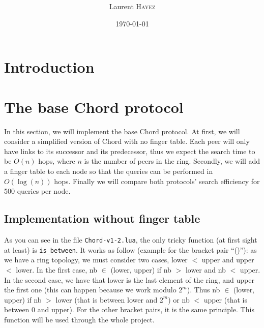 \documentclass[a4paper, 11pt]{article}
\title{%
  \normalfont{\bfseries{\rule{\linewidth}{2pt} Large-Scale Distributed Systems\\Project 2: Distributed Hash Tables\\ %
    \vspace{-0.4cm}  \rule{\linewidth}{2pt}}}
  }
\author{Laurent \textsc{Hayez}}
\date{\today}
\theoremstyle{plain}
\theoremstyle{definition}
\begin{document}
\renewcommand{\proofname}{{\scshape Proof}}
\renewcommand{\labelitemi}{\textbullet}


\maketitle

\renewcommand{\contentsname}{Table of contents}
\tableofcontents



\section{Introduction}
\label{sec:introduction}

  


\section{The base Chord protocol}
\label{sec:base-chord-protocol}

  In this section, we will implement the base Chord protocol. At first, we will consider a simplified version
  of Chord with no finger table. Each peer will only have links to its successor and its predecessor, thus we
  expect the search time to be $O(n)$ hops, where $n$ is the number of peers in the ring. Secondly, we will add a
  finger table to each node so that the queries can be performed in $O(\log(n))$ hops. Finally we will compare
  both protocols' search efficiency for 500 queries per node.

  \subsection{Implementation without finger table}
  \label{sec:implementation-without-ft}
  
    As you can see in the file \texttt{Chord-v1-2.lua}, the only tricky function (at first sight at least) is
    \texttt{is\_between}. It works as follow (example for the bracket pair ``()''): as we have a ring topology, we
    must consider two cases, lower $<$ upper and upper $<$ lower. In the first case, nb $\in$ (lower, upper)
    if nb $>$ lower and nb $<$ upper. In the second case, we have that lower is the last element of the ring,
    and upper the first one (this can happen because we work modulo $2^m$). Thus nb $\in$ (lower, upper) if nb
    $>$ lower (that is between lower and $2^m$) or nb $<$ upper (that is between $0$ and upper). For the other
    bracket pairs, it is the same principle. This function will be used through the whole project.
\end{document}

